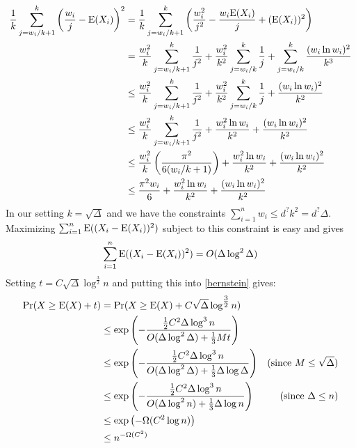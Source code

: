 \documentclass{patmorin}
\begin{document}
\begin{align*}
\frac{1}{k}\sum_{j=w_i/k+1}^k \left(\frac{w_i}{j}-\mathrm{E}(X_i)\right)^2
 & = \frac{1}{k}\sum_{j=w_i/k+1}^k \left(\frac{w_i^2}{j^2}-\frac{w_i \mathrm{E}(X_i)}{j} + (\mathrm{E}(X_i))^2\right) \\
 & = \frac{w_i^2}{k}\sum_{j=w_i/k+1}^k\frac{1}{j^2}
   + \frac{w_i^2}{k^2}\sum_{j=w_i/k}^k\frac{1}{j} + \sum_{j=w_i/k}^k\frac{(w_i\ln w_i)^2}{k^3} \\
 & \le \frac{w_i^2}{k}\sum_{j=w_i/k+1}^k\frac{1}{j^2}
   + \frac{w_i^2}{k^2}\sum_{j=w_i/k}^k\frac{1}{j} + \frac{(w_i\ln w_i)^2}{k^2}\\
 & \le \frac{w_i^2}{k}\sum_{j=w_i/k+1}^k\frac{1}{j^2}
    + \frac{w_i^2\ln w_i}{k^2} + \frac{(w_i\ln w_i)^2}{k^2} \\
 & \le \frac{w_i^2}{k}\left(\frac{\pi^2}{6(w_i/k+1)}\right)
    + \frac{w_i^2\ln w_i}{k^2} + \frac{(w_i\ln w_i)^2}{k^2} \\
  & \le \frac{\pi^2 w_i}{6}
     + \frac{w_i^2\ln w_i}{k^2} + \frac{(w_i\ln w_i)^2}{k^2} \\
\end{align*}
In our setting $k=\sqrt{\Delta}$ and we have the constraints $\sum_{i=1}^n w_i \le d^?k^2=d^?\Delta$.  Maximizing $\sum_{i=1}^n\mathrm{E}((X_i-\mathrm{E}(X_i))^2)$ subject to this constraint is easy and gives
\[
  \sum_{i=1}^n\mathrm{E}((X_i-\mathrm{E}(X_i))^2) = O(\Delta\log^{2}\Delta)
\]
Setting $t=C\sqrt{\Delta}\log^{\tfrac{3}{2}}n$ and putting this into \cref{bernstein} gives:
\begin{align*}
  \Pr(X\ge \mathrm{E}(X)+t)
  & = \Pr(X\ge \mathrm{E}(X)+C\sqrt{\Delta}\log^{\tfrac{3}{2}}n) \\
  & \le \exp \left(-\frac{\tfrac{1}{2}C^2\Delta\log^3n}{O(\Delta\log^{2}\Delta) + \tfrac{1}{3}Mt}\right) \\
  & \le \exp \left(-\frac{\tfrac{1}{2}C^2\Delta\log^3n}{O(\Delta\log^{2}\Delta) + \tfrac{1}{3}\Delta\log\Delta}\right) & \text{(since $M\le\sqrt{\Delta}$)} \\
  & \le \exp \left(-\frac{\tfrac{1}{2}C^2\Delta\log^3n}{O(\Delta\log^{2}n) + \tfrac{1}{3}\Delta\log n}\right) & \text{(since $\Delta \le n$)} \\
  & \le \exp \left(-\Omega(C^2\log n)\right) \\
  & \le n^{-\Omega(C^2)}
\end{align*}
\end{document}
